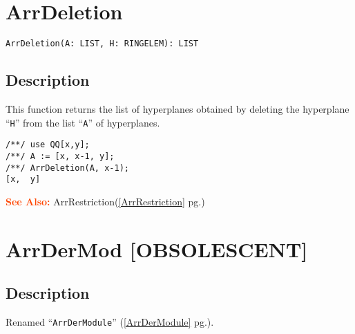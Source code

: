 \documentclass[a4paper]{mybook}
\newenvironment{command}{}{} %
\newcommand\SeeAlso{\par\textcolor{OrangeRed}{\textbf{\large See Also: }}}
\begin{document}
\section{ArrDeletion}
\label{ArrDeletion}
\begin{command} %


\begin{Verbatim}[label=syntax, rulecolor=\color{MidnightBlue},
frame=single]
ArrDeletion(A: LIST, H: RINGELEM): LIST 
\end{Verbatim}


\subsection*{Description}

This function returns the list of hyperplanes obtained by deleting
the hyperplane ``\verb&H&'' from the list ``\verb&A&'' of hyperplanes.
\begin{Verbatim}[label=example, rulecolor=\color{PineGreen}, frame=single]
/**/ use QQ[x,y];
/**/ A := [x, x-1, y];
/**/ ArrDeletion(A, x-1);
[x,  y]
\end{Verbatim}


\SeeAlso %
  ArrRestriction(\ref{ArrRestriction} pg.\pageref{ArrRestriction})
\end{command} %

\section{ArrDerMod [OBSOLESCENT]}
\label{ArrDerMod [OBSOLESCENT]}
\begin{command} %



\subsection*{Description}

Renamed ``\verb&ArrDerModule&'' (\ref{ArrDerModule} pg.\pageref{ArrDerModule}).

\end{command} %
\end{document}
